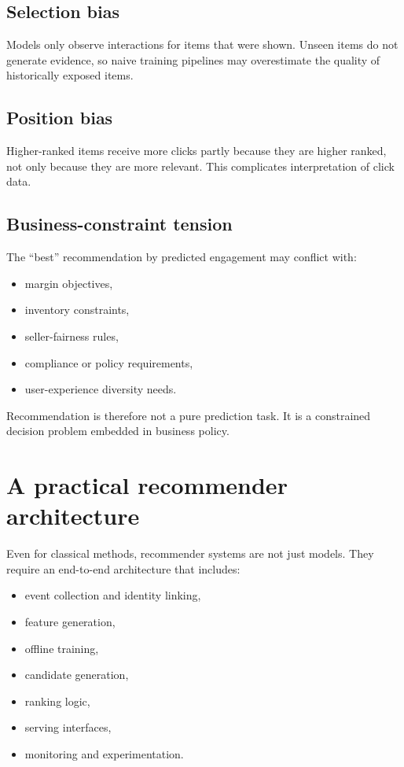 \subsection{Selection bias}
Models only observe interactions for items that were shown.
Unseen items do not generate evidence, so naive training pipelines may overestimate the quality of historically exposed items.

\subsection{Position bias}
Higher-ranked items receive more clicks partly because they are higher ranked, not only because they are more relevant.
This complicates interpretation of click data.

\subsection{Business-constraint tension}
The ``best'' recommendation by predicted engagement may conflict with:
\begin{itemize}
  \item margin objectives,
  \item inventory constraints,
  \item seller-fairness rules,
  \item compliance or policy requirements,
  \item user-experience diversity needs.
\end{itemize}

Recommendation is therefore not a pure prediction task.
It is a constrained decision problem embedded in business policy.

\section{A practical recommender architecture}
Even for classical methods, recommender systems are not just models.
They require an end-to-end architecture that includes:
\begin{itemize}
  \item event collection and identity linking,
  \item feature generation,
  \item offline training,
  \item candidate generation,
  \item ranking logic,
  \item serving interfaces,
  \item monitoring and experimentation.
\end{itemize}

